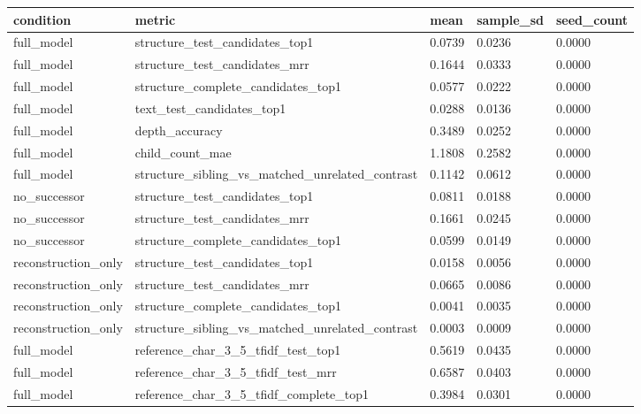 \begin{tabular}{lllll}
 \hline
condition & metric & mean & sample\_sd & seed\_count \\
 \hline
full\_model & structure\_test\_candidates\_top1 & 0.0739 & 0.0236 & 0.0000 \\
full\_model & structure\_test\_candidates\_mrr & 0.1644 & 0.0333 & 0.0000 \\
full\_model & structure\_complete\_candidates\_top1 & 0.0577 & 0.0222 & 0.0000 \\
full\_model & text\_test\_candidates\_top1 & 0.0288 & 0.0136 & 0.0000 \\
full\_model & depth\_accuracy & 0.3489 & 0.0252 & 0.0000 \\
full\_model & child\_count\_mae & 1.1808 & 0.2582 & 0.0000 \\
full\_model & structure\_sibling\_vs\_matched\_unrelated\_contrast & 0.1142 & 0.0612 & 0.0000 \\
no\_successor & structure\_test\_candidates\_top1 & 0.0811 & 0.0188 & 0.0000 \\
no\_successor & structure\_test\_candidates\_mrr & 0.1661 & 0.0245 & 0.0000 \\
no\_successor & structure\_complete\_candidates\_top1 & 0.0599 & 0.0149 & 0.0000 \\
reconstruction\_only & structure\_test\_candidates\_top1 & 0.0158 & 0.0056 & 0.0000 \\
reconstruction\_only & structure\_test\_candidates\_mrr & 0.0665 & 0.0086 & 0.0000 \\
reconstruction\_only & structure\_complete\_candidates\_top1 & 0.0041 & 0.0035 & 0.0000 \\
reconstruction\_only & structure\_sibling\_vs\_matched\_unrelated\_contrast & 0.0003 & 0.0009 & 0.0000 \\
full\_model & reference\_char\_3\_5\_tfidf\_test\_top1 & 0.5619 & 0.0435 & 0.0000 \\
full\_model & reference\_char\_3\_5\_tfidf\_test\_mrr & 0.6587 & 0.0403 & 0.0000 \\
full\_model & reference\_char\_3\_5\_tfidf\_complete\_top1 & 0.3984 & 0.0301 & 0.0000 \\
 \hline
\end{tabular}
